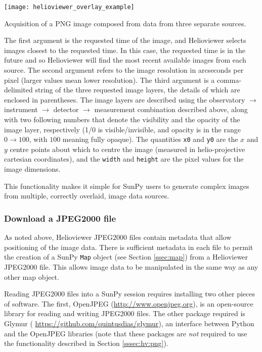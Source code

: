 \begin{listing}[H]
\begin{center}
\texttt{[image: helioviewer\_overlay\_example]}
\end{center}
\caption{Acquisition of a PNG image composed from data from three
  separate sources.}
\label{code:hv:overlaid}
\end{listing}

The first argument is the requested time of the image, and Helioviewer
selects images closest to the requested time.  In this case, the
requested time is in the future and so Helioviewer will find the most
recent available images from each source.  The second argument refers
to the image resolution in arcseconds per pixel (larger values mean
lower resolution).  The third argument is a comma-delimited string of
the three requested image layers, the details of which are enclosed
in parentheses. The image layers are described using the observatory
$\rightarrow$ instrument $\rightarrow$ detector $\rightarrow$
measurement combination described above, along with two following
numbers that denote the visibility and the opacity of the image layer,
respectively (1/0 is visible/invisible, and opacity is in the range
$0\rightarrow100$, with $100$ meaning fully opaque).  The quantities
\texttt{x0} and \texttt{y0} are the $x$ and $y$ centre points about
which to centre the image (measured in helio-projective cartesian
coordinates), and the \texttt{width} and \texttt{height} are the pixel
values for the image dimensions.

This functionality makes it simple for SunPy users to generate complex
images from multiple, correctly overlaid, image data sources.

\subsubsection{Download a JPEG2000 file}\label{sssec:hv:jp}

As noted above, Helioviewer JPEG2000 files contain metadata that allow
positioning of the image data.  There is sufficient metadata in each
file to permit the creation of a SunPy \texttt{Map} object (see Section
\ref{ssec:map}) from a Helioviewer JPEG2000 file.  This allows image
data to be manipulated in the same way as any other map object.

Reading JPEG2000 files into a SunPy session requires installing two
other pieces of software. The first, OpenJPEG
(\url{http://www.openjpeg.org}), is an open-source
library for reading and writing JPEG2000 files.  The other package 
required is Glymur (
\url{https://github.com/quintusdias/glymur}), an
interface between Python and the OpenJPEG libraries (note that these
packages are {\it not} required to use the functionality described in
Section \ref{sssec:hv:png}).

